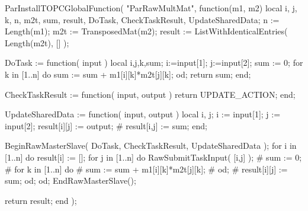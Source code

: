 ParInstallTOPCGlobalFunction( "ParRawMultMat", function(m1, m2)
  local i, j, k, n, m2t, sum, result, DoTask, CheckTaskResult, UpdateSharedData;
  n := Length(m1);
  m2t := TransposedMat(m2);
  result := ListWithIdenticalEntries( Length(m2t), [] );

  DoTask := function( input )
    local i,j,k,sum;
    i:=input[1]; j:=input[2];
    sum := 0;
    for k in [1..n] do
      sum := sum + m1[i][k]*m2t[j][k];
    od;
    return sum;
  end;

  CheckTaskResult := function( input, output )
    return UPDATE_ACTION;
  end;

  UpdateSharedData := function( input, output )
    local i, j;
    i := input[1]; j := input[2];
    result[i][j] := output;
    # result[i,j] := sum;
  end;

  BeginRawMasterSlave( DoTask, CheckTaskResult, UpdateSharedData );
  for i in [1..n] do
    result[i] := [];
    for j in [1..n] do
      RawSubmitTaskInput( [i,j] );
      # sum := 0;
      # for k in [1..n] do
      #   sum := sum + m1[i][k]*m2t[j][k];
      # od;
      # result[i][j] := sum;
    od;
  od;
  EndRawMasterSlave();

  return result;
end );
\endexample


